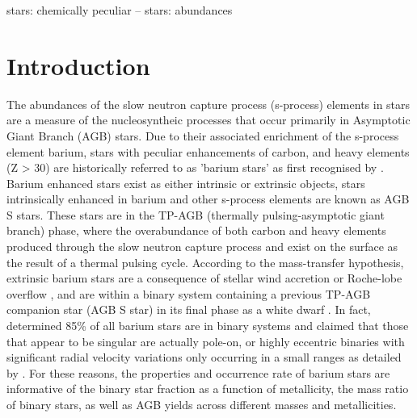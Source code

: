 \documentclass[a4paper,fleqn,usenatbib]{mnras}
\begin{document}
\begin{keywords}
stars: chemically peculiar -- stars: abundances
\end{keywords}

\section{Introduction} \label{sec:intro}

The abundances of the slow neutron capture process (s-process) elements in stars are a measure of the nucleosyntheic processes that occur primarily in Asymptotic Giant Branch (AGB) stars. Due to their associated enrichment of the s-process element barium, stars with peculiar enhancements of carbon, and heavy elements (Z > 30) are historically referred to as 'barium stars' as first recognised by \citet{Bidelman1951}. Barium enhanced stars exist as either intrinsic or extrinsic objects, stars intrinsically enhanced in barium and other s-process elements are known as AGB S stars. These stars are in the TP-AGB (thermally pulsing-asymptotic giant branch) phase, where the overabundance of both carbon and heavy elements produced through the slow neutron capture process and exist on the surface as the result of a thermal pulsing cycle. According to the mass-transfer hypothesis, extrinsic barium stars are a consequence of stellar wind accretion \citep{boffin1988,jorissen1992} or Roche-lobe overflow \citep{webbink1986}, and are within a binary system containing a previous TP-AGB companion star (AGB S star) in its final phase as a white dwarf \citep{bohm1980,bohm1984}. In fact, \citet{mcclure1983} determined 85\% of all barium stars are in binary systems and claimed that those that appear to be singular are actually pole-on, or highly eccentric binaries with significant radial velocity variations only occurring in a small ranges as detailed by \citet{pourbaix2004}. For these reasons, the properties and occurrence rate of barium stars are informative of the binary star fraction as a function of metallicity, the mass ratio of binary stars, as well as AGB yields across different masses and metallicities. 
\end{document}
